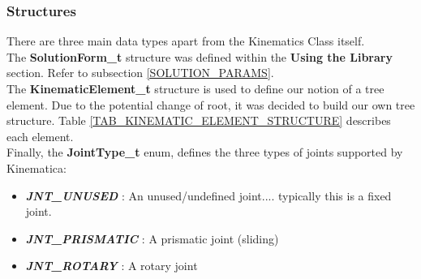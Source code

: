 \documentclass[12pt,a4paper,onecolumn]{article}
\begin{document}
\subsubsection*{Structures}
There are three main data types apart from the Kinematics Class itself.\\
\newline
The \textbf{SolutionForm\_t} structure was defined within the \textbf{Using the Library} section. Refer to subsection \ref{SOLUTION_PARAMS}.\\
\newline
The \textbf{KinematicElement\_t} structure is used to define our notion of a tree element. Due to the potential change of root, it was decided to build our own tree structure. Table \ref{TAB_KINEMATIC_ELEMENT_STRUCTURE} describes each element.\\
\newline
Finally, the \textbf{JointType\_t} enum, defines the three types of joints supported by Kinematica:
\begin{itemize}
\item \textbf{\textit{JNT\_UNUSED}} : An unused/undefined joint.... typically this is a fixed joint.
\item \textbf{\textit{JNT\_PRISMATIC}} : A prismatic joint (sliding)
\item \textbf{\textit{JNT\_ROTARY}} : A rotary joint
\end{itemize}
\end{document}
